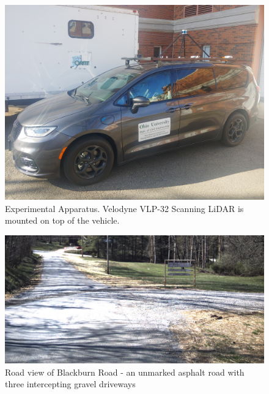 \documentclass[balance,upint,subscriptcorrection,varvw,mathalfa=cal=boondoxo,colorlinks]{asmeconf}
\begin{document}

	\begin{figure}
		\centering
		\includegraphics[width=0.9\linewidth]{figures/van_on_van}
		\caption[Experimental Apparatus]{Experimental Apparatus. Velodyne VLP-32 Scanning LiDAR is mounted on top of the vehicle.}
		\label{fig:Experimental_Apperatus}
	\end{figure}
	
	\begin{figure}
		\centering
		\includegraphics[width=0.9\linewidth]{figures/vlcsnap-2023-04-20-08h48m17s447}
		\caption[Blackburn Road Camera View]{Road view of Blackburn Road - an unmarked asphalt road with three intercepting gravel driveways}
		\label{fig:Blackburn_Road_View}
	\end{figure}
	
\end{document}

